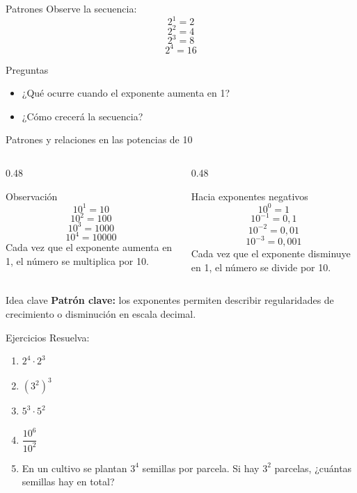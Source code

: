 \documentclass[aspectratio=169,10pt,handout]{beamer}
\newenvironment{ideaBox}
{\begin{exampleblock}{Idea clave}}
	{\end{exampleblock}}
\begin{document}
	\begin{frame}{Patrones}
		Observe la secuencia:
		\[
		2^1 = 2
		\]
		\[
		2^2 = 4
		\]
		\[
		2^3 = 8
		\]
		\[
		2^4 = 16
		\]
		
		\begin{block}{Preguntas}
			\begin{itemize}
				\item ¿Qué ocurre cuando el exponente aumenta en 1?
				\item ¿Cómo crecerá la secuencia?
			\end{itemize}
		\end{block}
	\end{frame}
	
	\begin{frame}{Patrones y relaciones en las potencias de 10}
		\begin{columns}[T,totalwidth=\textwidth]
			\begin{column}{0.48\textwidth}
				\begin{block}{Observación}
					\[
					10^1 = 10
					\]
					\[
					10^2 = 100
					\]
					\[
					10^3 = 1000
					\]
					\[
					10^4 = 10000
					\]
					Cada vez que el exponente aumenta en 1, el número se multiplica por 10.
				\end{block}
			\end{column}
			
			\begin{column}{0.48\textwidth}
				\begin{exampleblock}{Hacia exponentes negativos}
					\[
					10^0 = 1
					\]
					\[
					10^{-1} = 0{,}1
					\]
					\[
					10^{-2} = 0{,}01
					\]
					\[
					10^{-3} = 0{,}001
					\]
					Cada vez que el exponente disminuye en 1, el número se divide por 10.
				\end{exampleblock}
			\end{column}
		\end{columns}
		
		\vspace{0.2cm}
		\begin{ideaBox}
			\textbf{Patrón clave:} los exponentes permiten describir regularidades de crecimiento o disminución en escala decimal.
		\end{ideaBox}
	\end{frame}
	
	\begin{frame}{Ejercicios}
		Resuelva:
		\begin{enumerate}
			\item \(2^4 \cdot 2^3\)
			\item \((3^2)^3\)
			\item \(5^3 \cdot 5^2\)
			\item \(\dfrac{10^6}{10^2}\)
			\item En un cultivo se plantan \(3^4\) semillas por parcela. Si hay \(3^2\) parcelas, ¿cuántas semillas hay en total?
		\end{enumerate}
	\end{frame}
	
\end{document}
